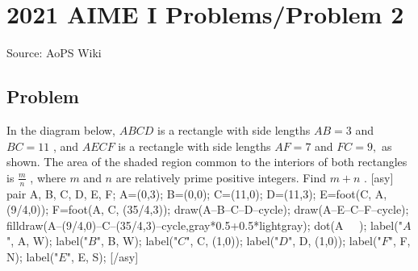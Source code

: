 \documentclass[12pt]{article}
\begin{document}
\section*{{2021 AIME I Problems/Problem 2}}
Source: AoPS Wiki

\subsection*{Problem}
In the diagram below, $ABCD$ is a rectangle with side lengths $AB=3$ and $BC=11$ , and $AECF$ is a rectangle with side lengths $AF=7$ and $FC=9,$ as shown. The area of the shaded region common to the interiors of both rectangles is $\frac mn$ , where $m$ and $n$ are relatively prime positive integers. Find $m+n$ . [asy] pair A, B, C, D, E, F; A=(0,3); B=(0,0); C=(11,0); D=(11,3); E=foot(C, A, (9/4,0)); F=foot(A, C, (35/4,3)); draw(A--B--C--D--cycle); draw(A--E--C--F--cycle); filldraw(A--(9/4,0)--C--(35/4,3)--cycle,gray*0.5+0.5*lightgray); dot(A^^B^^C^^D^^E^^F); label("$A$", A, W); label("$B$", B, W); label("$C$", C, (1,0)); label("$D$", D, (1,0)); label("$F$", F, N); label("$E$", E, S); [/asy]
\end{document}
